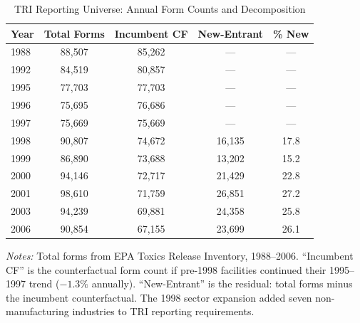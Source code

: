 \begin{table}[H]
\centering
\caption{TRI Reporting Universe: Annual Form Counts and Decomposition}
\label{tab:trends}
\begin{threeparttable}
\begin{tabular}{lcccc}
\toprule
Year & Total Forms & Incumbent CF & New-Entrant & \% New \\
\midrule
1988 & 88,507 & 85,262 & --- & --- \\
1992 & 84,519 & 80,857 & --- & --- \\
1995 & 77,703 & 77,703 & --- & --- \\
1996 & 75,695 & 76,686 & --- & --- \\
1997 & 75,669 & 75,669 & --- & --- \\
\midrule
1998 & 90,807 & 74,672 & 16,135 & 17.8 \\
1999 & 86,890 & 73,688 & 13,202 & 15.2 \\
2000 & 94,146 & 72,717 & 21,429 & 22.8 \\
2001 & 98,610 & 71,759 & 26,851 & 27.2 \\
2003 & 94,239 & 69,881 & 24,358 & 25.8 \\
2006 & 90,854 & 67,155 & 23,699 & 26.1 \\
\bottomrule
\end{tabular}
\begin{tablenotes}[flushleft]
\small
\item \textit{Notes:} Total forms from EPA Toxics Release Inventory, 1988--2006. ``Incumbent CF'' is the counterfactual form count if pre-1998 facilities continued their 1995--1997 trend ($-1.3\%$ annually). ``New-Entrant'' is the residual: total forms minus the incumbent counterfactual. The 1998 sector expansion added seven non-manufacturing industries to TRI reporting requirements.
\end{tablenotes}
\end{threeparttable}
\end{table}
